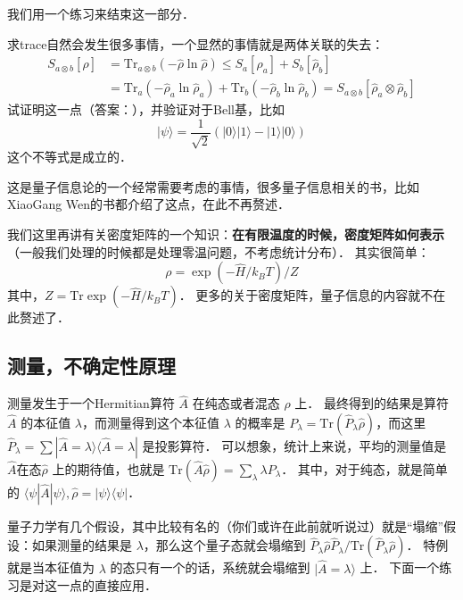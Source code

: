 我们用一个练习来结束这一部分．
\begin{exer}{}
求trace自然会发生很多事情，一个显然的事情就是两体关联的失去：
\begin{equation}
\begin{split}
S_{a\otimes b}[\hat\rho]&=\text{Tr}_{a\otimes b}(-\hat\rho\ln\hat\rho)\le S_a[\hat\rho_a]+S_b[\hat\rho_b]\\
&=\text{Tr}_a(-\hat\rho_a\ln\hat\rho_a)+\text{Tr}_b(-\hat\rho_b\ln\hat\rho_b)=S_{a\otimes b}[\hat\rho_a\otimes\hat\rho_b]
\end{split}
\end{equation}
试证明这一点（答案：\cite{trace}），并验证对于Bell基，比如
\begin{equation}
|\psi\rangle = \frac{1}{\sqrt{2}}(|0\rangle|1\rangle-|1\rangle|0\rangle)
\end{equation}
这个不等式是成立的．

这是量子信息论的一个经常需要考虑的事情，很多量子信息相关的书，比如XiaoGang Wen的书\cite{2015arXiv150802595Z}都介绍了这点，在此不再赘述．
\end{exer}

我们这里再讲有关密度矩阵的一个知识：{\bf 在有限温度的时候，密度矩阵如何表示}（一般我们处理的时候都是处理零温问题，不考虑统计分布）． 其实很简单：
\begin{equation}
\rho=\exp(-\hat{H}/k_BT)/Z
\end{equation}
其中，$Z=\text{Tr}\exp(-\hat{H}/k_BT)$． 更多的关于密度矩阵，量子信息的内容就不在此赘述了．


\subsection{测量，不确定性原理}

测量发生于一个Hermitian算符 $\hat A$ 在纯态或者混态 $\hat\rho$ 上． 最终得到的结果是算符 $\hat A$ 的本征值 $\lambda$，而测量得到这个本征值 $\lambda$ 的概率是 $P_\lambda=\text{Tr}(\hat{P}_\lambda\hat\rho)$，而这里 $\hat P_\lambda=\sum|\hat{A}=\lambda\rangle\langle\hat{A}=\lambda|$ 是投影算符． 可以想象，统计上来说，平均的测量值是 $\hat A$在态$\hat\rho$ 上的期待值，也就是 $\text{Tr}(\hat A\hat\rho)=\sum_\lambda \lambda P_\lambda$． 其中，对于纯态，就是简单的 $\langle\psi|\hat A|\psi\rangle, \hat\rho=|\psi\rangle\langle\psi|$．

量子力学有几个假设，其中比较有名的（你们或许在此前就听说过）就是``塌缩''假设：如果测量的结果是 $\lambda$，那么这个量子态就会塌缩到 ${\hat P_\lambda\hat\rho\hat P_\lambda}/{\text{Tr}(\hat P_\lambda\hat\rho)}$． 特例就是当本征值为 $\lambda$ 的态只有一个的话，系统就会塌缩到 $|\hat{A}=\lambda\rangle$ 上． 下面一个练习是对这一点的直接应用．


